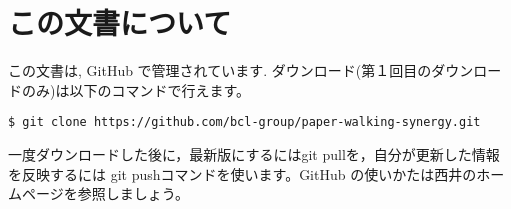 \documentclass{jarticle}
\begin{document}
\section{この文書について}

この文書は, GitHub で管理されています.
ダウンロード(第１回目のダウンロードのみ)は以下のコマンドで行えます。
\begin{verbatim}
$ git clone https://github.com/bcl-group/paper-walking-synergy.git
\end{verbatim}

一度ダウンロードした後に，最新版にするにはgit pullを，自分が更新した情報を反映するには
git pushコマンドを使います。GitHub の使いかたは西井のホームページを参照しましょう。
\end{document}
